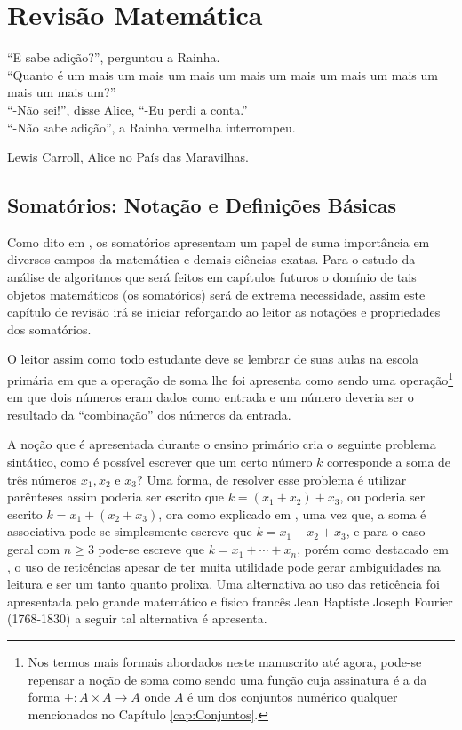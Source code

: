 \chapter{Revisão Matemática}\label{cap:ComplexidadeRevisao}


\epigraph{``E sabe adição?'', perguntou a Rainha.\\``Quanto é um mais um mais um mais um mais um mais um mais um mais um mais um mais um?''\\ ``-Não sei!'', disse Alice, ``-Eu perdi a conta.''\\ ``-Não sabe adição'', a Rainha vermelha interrompeu.}{Lewis Carroll, Alice no País das Maravilhas.}

\section{Somatórios: Notação e Definições Básicas}

Como dito em \cite{carmo2013}, os somatórios apresentam um papel de suma importância em diversos campos da matemática e demais ciências exatas. Para o estudo da análise de algoritmos que será feitos em capítulos futuros o domínio de tais objetos matemáticos (os somatórios) será de extrema necessidade, assim este capítulo de revisão irá se iniciar reforçando ao leitor as notações e propriedades dos somatórios.

O leitor assim como todo estudante deve se lembrar de suas aulas na escola primária em que a operação de soma lhe foi apresenta como sendo uma operação\footnote{Nos termos mais formais abordados neste manuscrito até agora, pode-se repensar a noção de soma como sendo uma função cuja assinatura é a da forma $+: A \times A \rightarrow A$ onde $A$ é um dos conjuntos numérico qualquer mencionados no Capítulo \ref{cap:Conjuntos}.} em que dois números eram dados como entrada e um número deveria ser o resultado da ``combinação'' dos números da entrada. 

A noção que é apresentada durante o ensino primário cria o seguinte problema sintático, como é possível escrever que um certo número $k$ corresponde a soma de três números $x_1, x_2$ e $x_3$? Uma forma, de resolver esse problema é utilizar parênteses assim poderia ser escrito que  $k = (x_1 + x_2) + x_3$, ou poderia ser escrito $k = x_1 + (x_2 + x_3)$,  ora como explicado em \cite{carmo2013, knuth-livro}, uma vez que, a soma é associativa pode-se simplesmente escreve que $k = x_1 + x_2 + x_3$, e para o caso geral com $n \geq 3$ pode-se escreve que $k = x_1 + \cdots + x_n$, porém como destacado em \cite{knuth-livro}, o uso de reticências apesar de ter muita utilidade pode gerar ambiguidades na leitura e ser um tanto quanto prolixa. Uma alternativa ao uso das reticência foi apresentada pelo grande matemático e físico francês Jean Baptiste Joseph Fourier (1768-1830) a seguir tal alternativa é apresenta.

